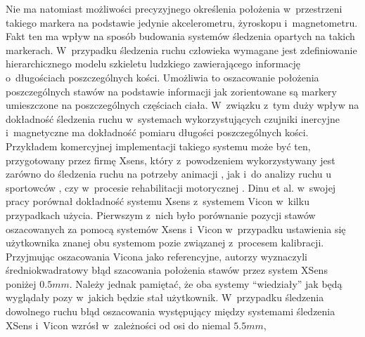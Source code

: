 Nie ma natomiast możliwości precyzyjnego określenia położenia w~przestrzeni takiego markera na podstawie jedynie akcelerometru, żyroskopu i~magnetometru. Fakt ten ma wpływ na sposób budowania systemów śledzenia opartych na takich markerach. W~przypadku śledzenia ruchu człowieka wymagane jest zdefiniowanie hierarchicznego modelu szkieletu ludzkiego zawierającego informację o~długościach poszczególnych kości. Umożliwia to oszacowanie położenia poszczególnych stawów na podstawie informacji jak zorientowane są markery umieszczone na poszczególnych częściach ciała. W~związku z~tym duży wpływ na dokładność śledzenia ruchu w~systemach wykorzystujących czujniki inercyjne i~magnetyczne ma dokładność pomiaru długości poszczególnych kości.\\
Przykładem komercyjnej implementacji takiego systemu może być ten, przygotowany przez firmę Xsens, który z~powodzeniem wykorzystywany jest zarówno do śledzenia ruchu na potrzeby animacji \cite{XsensEnt}, jak i~do analizy ruchu u sportowców \cite{XsensSport1,XsensSport2}, czy w~procesie rehabilitacji motorycznej \cite{XsensRehab}. Dinu et al. w~swojej pracy \cite{Dinu2016} porównał dokładność systemu Xsens z~systemem Vicon w~kilku przypadkach użycia. Pierwszym z~nich było porównanie pozycji stawów oszacowanych za pomocą systemów Xsens i~Vicon w~przypadku ustawienia się użytkownika znanej obu systemom pozie związanej z~procesem kalibracji. Przyjmując oszacowania Vicona jako referencyjne, autorzy wyznaczyli średniokwadratowy błąd szacowania położenia stawów przez system XSens poniżej $0.5mm$. Należy jednak pamiętać, że oba systemy "`wiedziały"' jak będą wyglądały pozy w~jakich będzie stał użytkownik. W~przypadku śledzenia dowolnego ruchu błąd oszacowania występujący między systemami śledzenia XSens i~Vicon wzrósł w~zależności od osi do niemal $5.5mm$,


